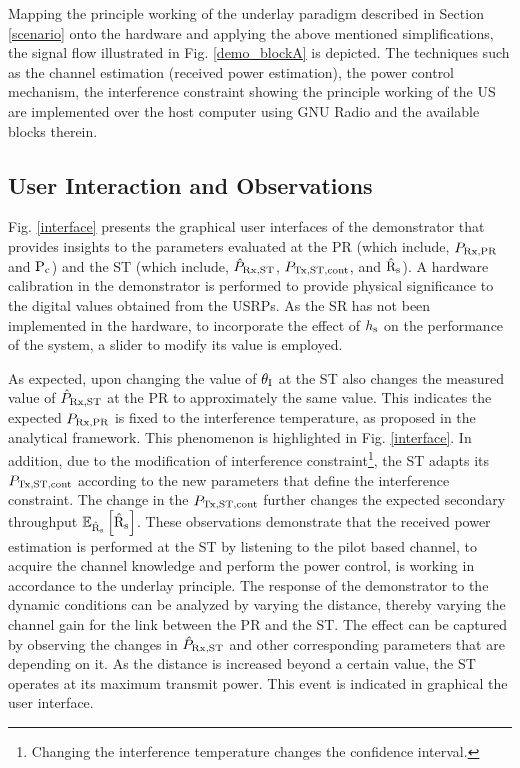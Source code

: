 Mapping the principle working of the underlay paradigm described in Section \ref{scenario} onto the hardware and applying the above mentioned simplifications, the signal flow illustrated in Fig. \ref{demo_blockA} is depicted. The techniques such as the channel estimation (received power estimation), the power control mechanism, the interference constraint showing the principle working of the US are implemented over the host computer using GNU Radio and the available blocks therein.


\subsection{User Interaction and Observations}

Fig. \ref{interface} presents the graphical user interfaces of the demonstrator that provides insights to the parameters evaluated at the PR (which include, $P_{\text{Rx,PR}}$ and $\text{P}_{\text{c}}$) and the ST (which include, $\hat{P}_{\text{Rx,ST}}$, $P_{\text{Tx,ST,cont}}$, and $\hat{\text{{R}}}_{\text{s}}$). A hardware calibration in the demonstrator is performed to provide physical significance to the digital values obtained from the USRPs. As the SR has not been implemented in the hardware, to incorporate the effect of $h_{\text{s}}$ on the performance of the system, a slider to modify its value is employed. %

As expected, upon changing the value of $\theta_{\text{I}}$ at the ST also changes the measured value of $\hat{P}_{\text{Rx,ST}}$ at the PR to approximately the same value. This indicates the expected $P_{\text{Rx,PR}}$ is fixed to the interference temperature, as proposed in the analytical framework. This phenomenon is highlighted in Fig. \ref{interface}. In addition, due to the modification of interference constraint\footnote{Changing the interference temperature changes the confidence interval.}, the ST adapts its $P_{\text{Tx,ST,cont}}$ according to the new parameters that define the interference constraint. The change in the $P_{\text{Tx,ST,cont}}$ further changes the expected secondary throughput ${\mathbb E}_{\hat{\text{{R}}}_{\text{s}}}\left[ \hat{\text{{R}}}_{\text{s}} \right]$. These observations demonstrate that the received power estimation is performed at the ST by listening to the pilot based channel, to acquire the channel knowledge and perform the power control, is working in accordance to the underlay principle. The response of the demonstrator to the dynamic conditions can be analyzed by varying the distance, thereby varying the channel gain for the link between the PR and the ST. The effect can be captured by observing the changes in $\hat{P}_{\text{Rx,ST}}$ and other corresponding parameters that are depending on it. As the distance is increased beyond a certain value, the ST operates at its maximum transmit power. This event is indicated in graphical the user interface.

